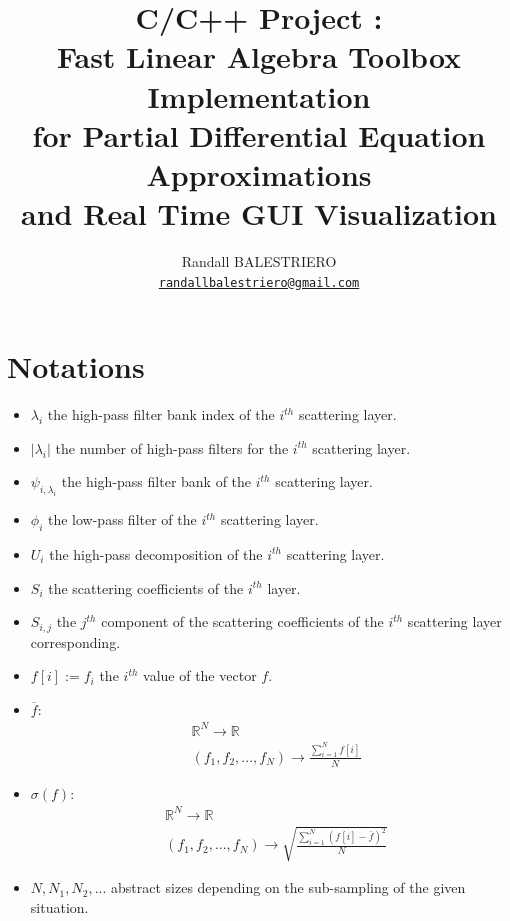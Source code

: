 \documentclass[a4paper]{report}
\title{C/C++ Project :
\\Fast Linear Algebra Toolbox Implementation
\\for Partial Differential Equation Approximations
\\and Real Time GUI Visualization}
\author{Randall BALESTRIERO\\

\texttt{\url{randallbalestriero@gmail.com}}}
\affil{Department of Mathematics, Pierre et Marie Curie University Paris 6}
\begin{document}
\maketitle

\newpage
\section*{Notations}
\begin{itemize}

\item $\lambda_i$ the high-pass filter bank index of the $i^{th}$ scattering layer.
\item $| \lambda_i|$ the number of high-pass filters for the $i^{th}$ scattering layer.
\item $\psi_{i,\lambda_i}$ the high-pass filter bank of the $i^{th}$ scattering layer.
\item $\phi_i$ the low-pass filter of the $i^{th}$ scattering layer.
\item $U_i$ the high-pass decomposition of the $i^{th}$ scattering layer.
\item $S_i$ the scattering coefficients of the $i^{th}$ layer.
\item $S_{i,j}$ the $j^{th}$ component of the scattering coefficients of the $i^{th}$ scattering layer corresponding.
\item $f[i]:=f_i$ the $i^{th}$ value of the vector $f$.
\item $\overline{f}: $ 
\begin{align*}
& \mathbb{R}^N  \rightarrow  \mathbb{R} \\
 & (f_1,f_2,...,f_N) \rightarrow \frac{\sum_{i=1}^N f[i]}{N}
\end{align*}

\item $\sigma(f):$
\begin{align*}
&\mathbb{R}^N \rightarrow \mathbb{R} \\
& (f_1,f_2,...,f_N) \rightarrow \sqrt{ \frac{\sum_{i=1}^N(f[i]-\overline{f})^2}{N}}
\end{align*}
\item $N,N_1,N_2,...$ abstract sizes depending on the sub-sampling of the given situation.
\end{itemize}


\tableofcontents
\end{document}
